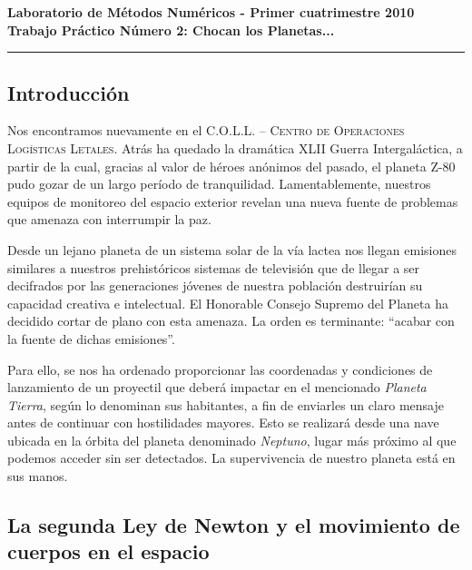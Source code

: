 
% 

\begin{centering}
\bf Laboratorio de M\'etodos Num\'ericos - Primer cuatrimestre 2010 \\
\bf Trabajo Pr\'actico N\'umero 2: Chocan los Planetas... \\
\end{centering}

\vskip 25pt
\hrule
\vskip 11pt

\subsection*{Introducción}

Nos encontramos nuevamente en el {\scshape C.O.L.L. -- Centro de Operaciones Logísticas Letales}. Atrás ha quedado la dramática XLII Guerra Intergaláctica, a partir de la cual, gracias al valor de héroes anónimos del pasado, el planeta Z-80 pudo gozar de un largo período de tranquilidad. Lamentablemente, nuestros equipos de monitoreo del espacio exterior revelan una nueva fuente de problemas que amenaza con interrumpir la paz.

Desde un lejano planeta de un sistema solar de la vía lactea nos llegan emisiones similares a nuestros prehistóricos sistemas de televisión que de llegar a ser decifrados por las generaciones jóvenes de nuestra población destruirían su capacidad creativa e intelectual. El Honorable Consejo Supremo del Planeta ha decidido cortar de plano con esta amenaza. La orden es terminante: ``acabar con la fuente de dichas emisiones''.

Para ello, se nos ha ordenado proporcionar las coordenadas y condiciones de lanzamiento de un proyectil que deberá impactar en el mencionado \emph{Planeta Tierra}, según lo denominan sus habitantes, a fin de enviarles un claro mensaje antes de continuar con hostilidades mayores.
Esto se realizará desde una nave ubicada en la órbita del planeta denominado \emph{Neptuno}, lugar más próximo al que podemos acceder sin ser detectados.
La supervivencia de nuestro planeta está en sus manos.

\subsection*{La segunda Ley de Newton y el movimiento de cuerpos en el espacio}

